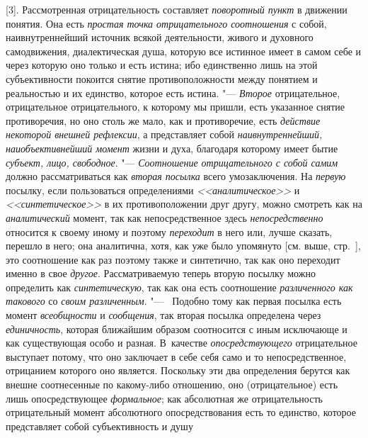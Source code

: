 {{[3]. Рассмотренная отрицательность составляет {\em поворотный пункт} в
движении понятия. Она есть {\em простая
точка отрицательного соотношения} с собой, наивнутреннейший
источник всякой деятельности, живого и духовного самодвижения,
диалектическая душа, которую все истинное имеет в самом себе и через
которую оно только и есть истина; ибо единственно лишь на этой
субъективности покоится снятие противоположности между понятием и
реальностью и их единство, которое есть истина. "--- {\em Второе}
отрицательное, отрицательное отрицательного, к которому мы
пришли, есть указанное снятие противоречия, но оно столь же мало, как и
противоречие, есть {\em действие
некоторой внешней рефлексии}, а представляет собой
{\em наивнутреннейший, наиобъективнейший
момент} жизни и духа, благодаря которому имеет бытие
{\em субъект, лицо, свободное}. "--- {\em Соотношение отрицательного с собой
самим} должно рассматриваться как {\em вторая посылка} всего умозаключения. На
{\em первую} посылку, если пользоваться определениями
{\em <<аналитическое>>} и {\em <<синтетическое>>} в
их противоположении друг другу, можно смотреть как на {\em аналитический}
момент, так как непосредственное здесь {\em непосредственно}
относится к своему иному и поэтому {\em переходит} в него
или, лучше сказать, перешло в него; она аналитична, хотя, как уже было
упомянуто [см. выше, стр.~\pageref{bkm:bmpg224a}], это
соотношение как раз поэтому также и синтетично, так как оно переходит
именно в свое {\em другое}. Рассматриваемую теперь вторую
посылку можно определить как {\em синтетическую}, так
как она есть соотношение {\em различенного как такового} со {\em своим
различенным}. "--- ~Подобно тому как первая посылка есть момент
{\em всеобщности} и {\em сообщения}, так
вторая посылка определена через {\em единичность},
которая ближайшим образом соотносится с иным исключающе и
как существующая особо и разная. В~качестве {\em опосредствующего}
отрицательное выступает потому, что оно заключает в себе себя
само и то непосредственное, отрицанием которого оно
является. Поскольку эти два определения берутся как внешне соотнесенные по
какому-либо отношению, оно (отрицательное) есть лишь опосредствующее
{\em формальное}; как
абсолютная же отрицательность отрицательный момент абсолютного
опосредствования есть то единство, которое представляет собой субъективность и
душу}}
